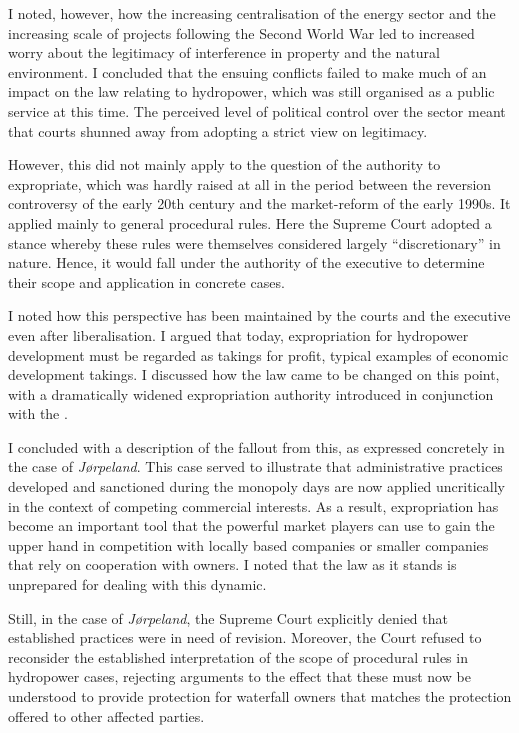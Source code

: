 I noted, however, how the increasing centralisation of the energy sector and the increasing scale of projects following the Second World War led to increased worry about the legitimacy of interference in property and the natural environment. I concluded that the ensuing conflicts failed to make much of an impact on the law relating to hydropower, which was still organised as a public service at this time. 
The perceived level of political control over the sector meant that courts shunned away from adopting a strict view on legitimacy. 

However, this did not mainly apply to the question of the authority to expropriate, which was hardly raised at all in the period between the reversion controversy of the early 20th century and the market-reform of the early 1990s. It applied mainly to general procedural rules. Here the Supreme Court adopted a stance whereby these rules were themselves considered largely ``discretionary'' in nature. Hence, it would fall under the authority of the executive to determine their scope and application in concrete cases.

I noted how this perspective has been maintained by the courts and the executive even after liberalisation. I argued that today, expropriation for hydropower development must be regarded as takings for profit, typical examples of economic development takings. I discussed how the law came to be changed on this point, with a dramatically widened expropriation authority introduced in conjunction with the \cite{wra00}.

I concluded with a description of the fallout from this, as expressed concretely in the case of {\it Jørpeland}. This case served to illustrate that administrative practices developed and sanctioned during the monopoly days are now applied uncritically in the context of competing commercial interests. As a result,  expropriation has become an important tool that the powerful market players can use to gain the upper hand in competition with locally based companies or smaller companies that rely on cooperation with owners. I noted that the law as it stands is unprepared for dealing with this dynamic. 

Still, in the case of {\it Jørpeland}, the Supreme Court explicitly denied that established practices were in need of revision. Moreover, the Court refused to reconsider the established interpretation of the scope of procedural rules in hydropower cases, rejecting arguments to the effect that these must now be understood to provide protection for waterfall owners that matches the protection offered to other affected parties.

